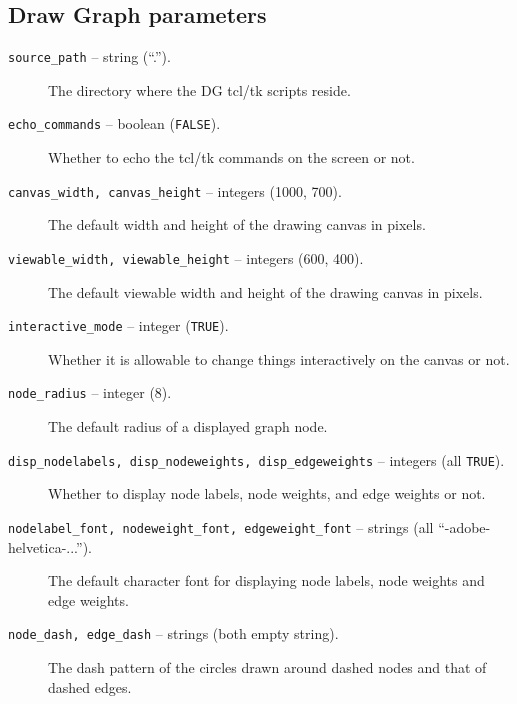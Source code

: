 \subsection{Draw Graph parameters}
\begin{description}

\item[{\tt source\_path} -- string (``.'').]
The directory where the DG tcl/tk scripts reside.

\item[{\tt echo\_commands} -- boolean ({\tt FALSE}).]
Whether to echo the tcl/tk commands on the screen or not.

\item[{\tt canvas\_width, canvas\_height} -- integers (1000, 700).]
The default width and height of the drawing canvas in pixels.

\item[{\tt viewable\_width, viewable\_height} -- integers (600, 400).]
The default viewable width and height of the drawing canvas in pixels.

\item[{\tt interactive\_mode} -- integer ({\tt TRUE}).]
Whether it is allowable to change things interactively on the canvas or not.

\item[{\tt node\_radius} -- integer (8).]
The default radius of a displayed graph node.

\item[{\tt disp\_nodelabels, disp\_nodeweights, disp\_edgeweights} -- integers
(all {\tt TRUE}).]
Whether to display node labels, node weights, and edge weights or not.

\item[{\tt nodelabel\_font, nodeweight\_font, edgeweight\_font} -- strings
(all ``-adobe-helvetica-...'').]
The default character font for displaying node labels, node weights and edge
weights. 

\item[{\tt node\_dash, edge\_dash} -- strings (both empty string).]
The dash pattern of the circles drawn around dashed nodes and that of
dashed edges.

\end{description}

